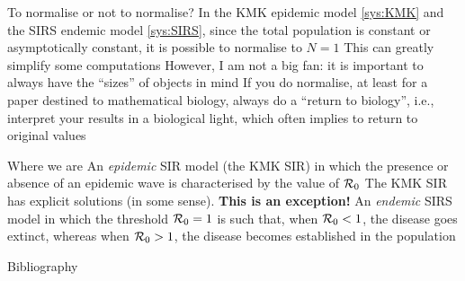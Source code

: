 \documentclass[aspectratio=169]{beamer}\usepackage[]{graphicx}\usepackage[]{xcolor}
\begin{document}
\begin{frame}{To normalise or not to normalise?}
\bbullet In the KMK epidemic model \eqref{sys:KMK} and the SIRS endemic model \eqref{sys:SIRS}, since the total population is constant or asymptotically constant, it is possible to normalise to $N=1$
\vfill
\bbullet This can greatly simplify some computations
\vfill
\bbullet However, I am not a big fan: it is important to always have the ``sizes'' of objects in mind
\vfill
\bbullet If you do normalise, at least for a paper destined to mathematical biology, always do a ``return to biology'', i.e., interpret your results in a biological light, which often implies to return to original values
\end{frame}

\begin{frame}{Where we are}
\bbullet An \emph{epidemic} SIR model (the KMK SIR) in which the presence or absence of an epidemic wave is characterised by the value of $\mathcal{R}_0$
\vfill
\bbullet The KMK SIR has explicit solutions (in some sense). \textbf{This is an exception!}
\vfill
\bbullet An \emph{endemic} SIRS model in which the threshold $\mathcal{R}_0=1$ is such that, when $\mathcal{R}_0<1$, the disease goes extinct, whereas when $\mathcal{R}_0>1$, the disease becomes established in the population
\end{frame}


\begin{frame}{Bibliography}


\end{frame}
\end{document}
